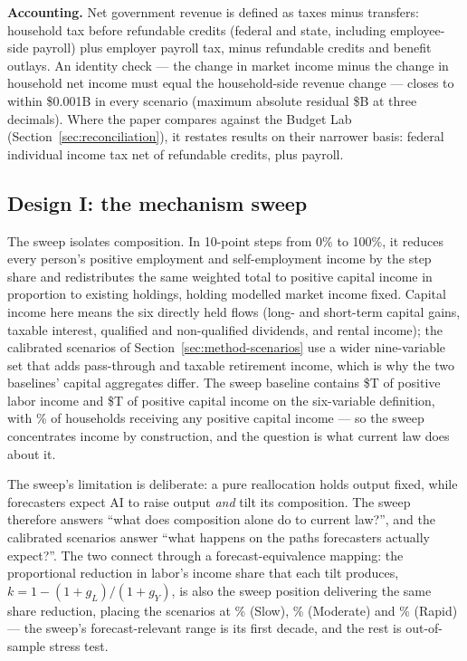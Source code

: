 \textbf{Accounting.} Net government revenue is defined as taxes minus
transfers: household tax before refundable credits (federal and state,
including employee-side payroll) plus employer payroll tax, minus refundable
credits and benefit outlays. An identity check --- the change in market
income minus the change in household net income must equal the household-side
revenue change --- closes to within \$0.001B in every scenario (maximum
absolute residual \$\genIdentityMaxResidual B at three decimals).
Where the paper compares against the Budget Lab
(Section~\ref{sec:reconciliation}), it restates results on their narrower
basis: federal individual income tax net of refundable credits, plus payroll.

\subsection{Design I: the mechanism sweep}\label{sec:method-sweep}

The sweep isolates composition. In 10-point steps from 0\% to 100\%, it
reduces every person's positive employment and self-employment income by the
step share and redistributes the same weighted total to positive capital
income in proportion to existing holdings, holding modelled market income
fixed. Capital income here means the six directly held flows (long- and
short-term capital gains, taxable interest, qualified and non-qualified
dividends, and rental income); the calibrated scenarios of
Section~\ref{sec:method-scenarios} use a wider nine-variable set that adds
pass-through and taxable retirement income, which is why the two baselines'
capital aggregates differ. The \genSweepYear{} sweep baseline contains
\$\genSweepLaborT T of positive labor income and \$\genSweepCapitalT T of
positive capital income on the six-variable definition, with
\genSweepHHCapSharePct\% of households receiving any positive capital income
--- so the sweep concentrates income by construction, and the question is
what current law does about it.

The sweep's limitation is deliberate: a pure reallocation holds output fixed,
while forecasters expect AI to raise output \emph{and} tilt its composition.
The sweep therefore answers ``what does composition alone do to current
law?'', and the calibrated scenarios answer ``what happens on the paths
forecasters actually expect?''. The two connect through a
forecast-equivalence mapping: the proportional reduction in labor's income
share that each tilt produces, $k = 1 - (1+g_L)/(1+g_Y)$, is also the sweep
position delivering the same share reduction, placing the scenarios at
\genForecastShiftSlowPct\% (Slow), \genForecastShiftModPct\% (Moderate) and
\genForecastShiftRapidPct\% (Rapid) --- the sweep's forecast-relevant range
is its first decade, and the rest is out-of-sample stress test.

